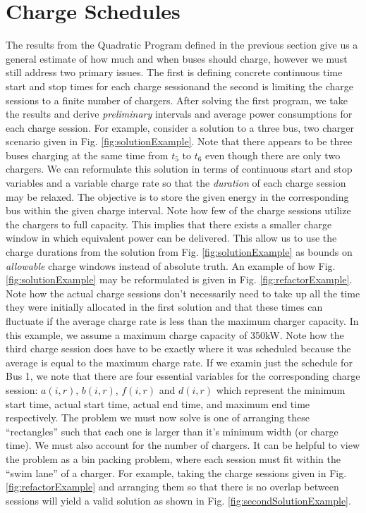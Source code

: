 



\section{Charge Schedules}
The results from the Quadratic Program defined in the previous section give us a general estimate of how much and when buses should charge, however we must still address two primary issues. The first is defining concrete continuous time start and stop times for each charge sessionand the second is limiting the charge sessions to a finite number of chargers. After solving the first program, we take the results and derive {\it preliminary} intervals and average power consumptions for each charge session.  For example, consider a solution to a three bus, two charger scenario given in Fig. \ref{fig:solutionExample}.
Note that there appears to be three buses charging at the same time from $t_5$ to $t_6$ even though there are only two chargers.  We can reformulate this solution in terms of continuous start and stop variables and a variable charge rate so that the {\it duration} of each charge session may be relaxed. The objective is to store the given energy in the corresponding bus within the given charge interval.  Note how few of the charge sessions utilize the chargers to full capacity. This implies that there exists a smaller charge window in which equivalent power can be delivered. This allow us to use the charge durations from the solution from Fig. \ref{fig:solutionExample} as bounds on {\it allowable} charge windows instead of absolute truth. An example of how Fig. \ref{fig:solutionExample} may be reformulated is given in Fig. \ref{fig:refactorExample}. Note how the actual charge sessions don't necessarily need to take up all the time they were initially allocated in the first solution and that these times can fluctuate if the average charge rate is less than the maximum charger capacity. In this example, we assume a maximum charge capacity of 350kW.  Note how the third charge session does have to be exactly where it was scheduled because the average is equal to the maximum charge rate.
If we examin just the schedule for Bus 1, we note that there are four essential variables for the corresponding charge session: $a(i,r)$, $b(i,r)$, $f(i,r)$ and $d(i,r)$ which represent the minimum start time, actual start time, actual end time, and maximum end time respectively. The problem we must now solve is one of arranging these ``rectangles'' such that each one is larger than it's minimum width (or charge time).  We must also account for the number of chargers. It can be helpful to view the problem as a bin packing problem, where each session must fit within the ``swim lane'' of a charger.  For example, taking the charge sessions given in Fig. \ref{fig:refactorExample} and arranging them so that there is no overlap between sessions will yield a valid solution as shown in Fig. \ref{fig:secondSolutionExample}.
